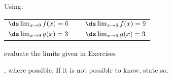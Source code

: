 {\noindent Using:

\begin{tabular}{lll}
$\ds \lim_{x\to9}f(x) = 6$ & \quad\quad &$\ds \lim_{x\to6} f(x) = 9$\\
$\ds \lim_{x\to9}g(x) = 3$ &  & $\ds \lim_{x\to6} g(x) = 3$
\end{tabular}

\noindent evaluate the limits given in Exercises}
{, where possible. If it is not possible to know, state so.}
